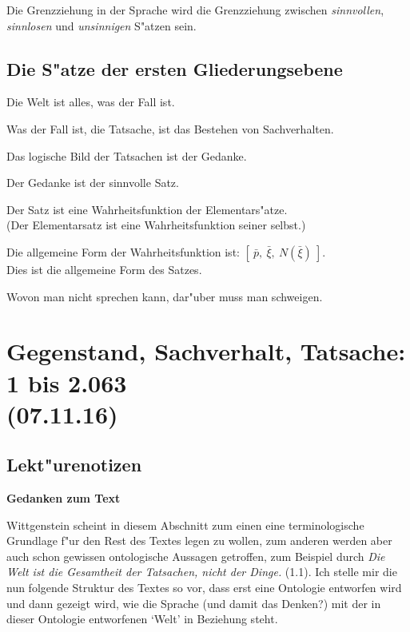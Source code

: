 \documentclass[]{scrartcl}
\begin{document}
Die Grenzziehung in der Sprache wird die Grenzziehung zwischen \emph{sinnvollen}, \emph{sinnlosen} und \emph{unsinnigen} S"atzen sein.

\subsection{Die S"atze der ersten Gliederungsebene}
\begin{description}[leftmargin=!,labelwidth=\widthof{\bfseries 12}]
  \item[1] Die Welt ist alles, was der Fall ist.
  \item[2] Was der Fall ist, die Tatsache, ist das Bestehen von Sachverhalten.
  \item[3] Das logische Bild der Tatsachen ist der Gedanke.
  \item[4] Der Gedanke ist der sinnvolle Satz.
  \item[5] Der Satz ist eine Wahrheitsfunktion der Elementars"atze.\\
(Der Elementarsatz ist eine Wahrheitsfunktion seiner selbst.)
  \item[6] Die allgemeine Form der Wahrheitsfunktion ist: $[~\bar{p},~\bar{\xi},~N(\bar{\xi})~]$.\\
Dies ist die allgemeine Form des Satzes.
  \item[7] Wovon man nicht sprechen kann, dar"uber muss man schweigen.
\end{description}

\section{Gegenstand, Sachverhalt, Tatsache: 1 bis 2.063\\(07.11.16)}
\subsection{Lekt"urenotizen}
\textbf{Gedanken zum Text}

Wittgenstein scheint in diesem Abschnitt zum einen eine terminologische Grundlage f"ur den Rest des Textes legen zu wollen, zum anderen werden aber auch schon gewissen ontologische Aussagen getroffen, zum Beispiel durch \emph{Die Welt ist die Gesamtheit der Tatsachen, nicht der Dinge.} (1.1). Ich stelle mir die nun folgende Struktur des Textes so vor, dass erst eine Ontologie entworfen wird und dann gezeigt wird, wie die Sprache (und damit das Denken?) mit der in dieser Ontologie entworfenen `Welt' in Beziehung steht. 
\end{document}

